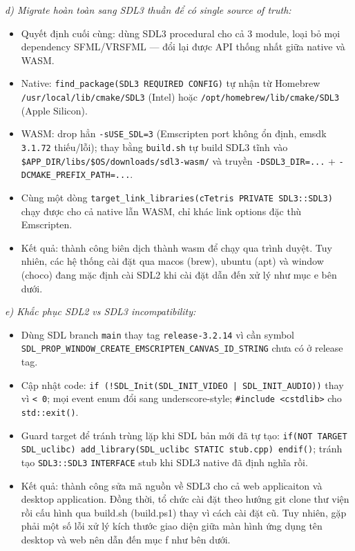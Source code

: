 \documentclass[12pt,a4paper]{article}
\begin{document}
\textit{d) Migrate hoàn toàn sang SDL3 thuần để có single source of truth:}
\begin{itemize}
    \item Quyết định cuối cùng: dùng SDL3 procedural cho cả 3 module, loại bỏ mọi dependency SFML/VRSFML — đổi lại được API thống nhất giữa native và WASM.
    \item Native: \texttt{find\_package(SDL3 REQUIRED CONFIG)} tự nhận từ Homebrew \texttt{/usr/local/lib/cmake/SDL3} (Intel) hoặc \texttt{/opt/homebrew/lib/cmake/SDL3} (Apple Silicon).
    \item WASM: drop hẳn \texttt{-sUSE\_SDL=3} (Emscripten port không ổn định, emsdk \texttt{3.1.72} thiếu/lỗi); thay bằng \texttt{build.sh} tự build SDL3 tĩnh vào \texttt{\$APP\_DIR/\allowbreak libs/\allowbreak \$OS/\allowbreak downloads/\allowbreak sdl3-wasm/} và truyền \texttt{-DSDL3\_DIR=...} + \texttt{-DCMAKE\_PREFIX\_PATH=...}.
    \item Cùng một dòng \texttt{target\_link\_libraries(cTetris PRIVATE SDL3::SDL3)} chạy được cho cả native lẫn WASM, chỉ khác link options đặc thù Emscripten.
    \item Kết quả: thành công biên dịch thành wasm để chạy qua trình duyệt. Tuy nhiên, các hệ thống cài đặt qua macos (brew), ubuntu (apt) và window (choco) đang mặc định cài SDL2 khi cài đặt dẫn đến xử lý như mục e bên dưới.
\end{itemize}

\textit{e) Khắc phục SDL2 vs SDL3 incompatibility:}
\begin{itemize}
    \item Dùng SDL branch \texttt{main} thay tag \texttt{release-3.2.14} vì cần symbol \texttt{SDL\_PROP\_\allowbreak WINDOW\_CREATE\_\allowbreak EMSCRIPTEN\_\allowbreak CANVAS\_ID\_STRING} chưa có ở release tag.
    \item Cập nhật code: \texttt{if (!SDL\_Init(SDL\_INIT\_VIDEO | SDL\_INIT\_AUDIO))} thay vì \texttt{< 0}; mọi event enum đổi sang underscore-style; \texttt{\#include <cstdlib>} cho \texttt{std::exit()}.
    \item Guard target để tránh trùng lặp khi SDL bản mới đã tự tạo: \texttt{if(NOT TARGET SDL\_uclibc) add\_library(SDL\_uclibc STATIC stub.cpp) endif()}; tránh tạo \texttt{SDL3::SDL3} \texttt{INTERFACE} stub khi SDL3 native đã định nghĩa rồi.
    \item Kết quả: thành công sửa mã nguồn về SDL3 cho cả web applicaiton và desktop application. Đồng thời, tổ chức cài đặt theo hướng git clone thư viện rồi cấu hình qua build.sh (build.ps1) thay vì cách cài đặt cũ. Tuy nhiên, gặp phải một số lỗi xử lý kích thước giao diện giữa màn hình ứng dụng tên desktop và web nên dẫn đến mục f như bên dưới.
\end{itemize}
\end{document}
